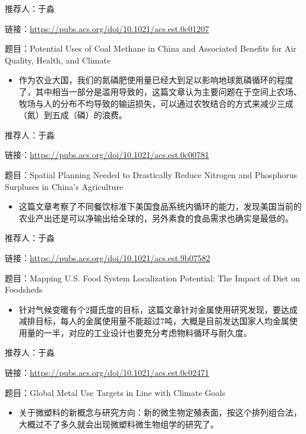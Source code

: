\documentclass[
]{book}
\providecommand{\tightlist}{%
  \setlength{\itemsep}{0pt}\setlength{\parskip}{0pt}}
\begin{document}
推荐人：于淼

链接：\url{https://pubs.acs.org/doi/10.1021/acs.est.0c01207}

题目：Potential Uses of Coal Methane in China and Associated Benefits for Air Quality, Health, and Climate

\begin{itemize}
\tightlist
\item
  作为农业大国，我们的氮磷肥使用量已经大到足以影响地球氮磷循环的程度了，其中相当一部分是滥用导致的，这篇文章认为主要问题在于空间上农场、牧场与人的分布不均导致的输运损失，可以通过农牧结合的方式来减少三成（氮）到五成（磷）的浪费。
\end{itemize}

推荐人：于淼

链接：\url{https://pubs.acs.org/doi/10.1021/acs.est.0c00781}

题目：Spatial Planning Needed to Drastically Reduce Nitrogen and Phosphorus Surpluses in China's Agriculture

\begin{itemize}
\tightlist
\item
  这篇文章考察了不同餐饮标准下美国食品系统内循环的能力，发现美国当前的农业产出还是可以净输出给全球的，另外素食的食品需求也确实是最低的。
\end{itemize}

推荐人：于淼

链接：\url{https://pubs.acs.org/doi/10.1021/acs.est.9b07582}

题目：Mapping U.S. Food System Localization Potential: The Impact of Diet on Foodsheds

\begin{itemize}
\tightlist
\item
  针对气候变暖有个2摄氏度的目标，这篇文章针对金属使用研究发现，要达成减排目标，每人的金属使用量不能超过7吨，大概是目前发达国家人均金属使用量的一半，对应的工业设计也要充分考虑物料循环与耐久度。
\end{itemize}

推荐人：于淼

链接：\url{https://pubs.acs.org/doi/10.1021/acs.est.0c02471}

题目：Global Metal Use Targets in Line with Climate Goals

\begin{itemize}
\tightlist
\item
  关于微塑料的新概念与研究方向：新的微生物定殖表面，按这个排列组合法，大概过不了多久就会出现微塑料微生物组学的研究了。
\end{itemize}
\end{document}
